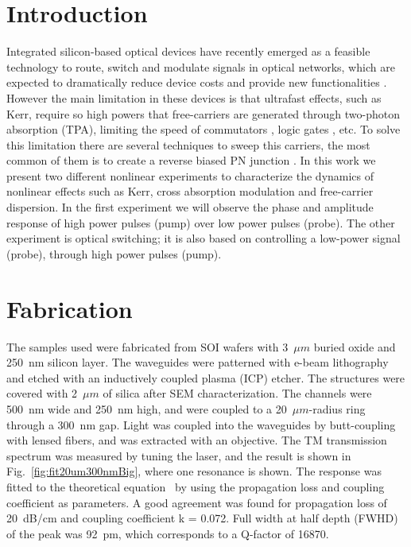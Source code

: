 \section{Introduction}
Integrated silicon-based optical devices have recently emerged as a feasible technology to route, switch and modulate signals in optical networks, which are expected to dramatically reduce device costs and provide new functionalities \cite{Soref2006}. However the main limitation in these devices is that ultrafast effects, such as Kerr, require so high powers that free-carriers are generated through two-photon absorption (TPA), limiting the speed of commutators \cite{Oton}, logic gates \cite{Oton2010}, etc.
To solve this limitation there are several techniques to sweep this carriers, the most common  of them is to create a reverse biased PN junction \cite{Turner-Foster2010}.
In this work we present two different nonlinear experiments to characterize the dynamics of nonlinear effects such as Kerr, cross absorption modulation and free-carrier dispersion. In the first experiment we will observe the phase and amplitude response of high power pulses (pump) over low power pulses (probe). The other experiment is optical switching; it is also based on controlling a low-power signal (probe), through high power pulses (pump).


 
\section{Fabrication}
The samples used were fabricated from SOI wafers with 3~$\mu m$ buried oxide and 250~nm silicon layer. The waveguides were patterned with e-beam lithography and etched with an inductively coupled plasma (ICP) etcher. The structures were covered with 2~$\mu m$ of silica after SEM characterization. The channels were 500~nm wide and 250~nm high, and were coupled to a 20~$\mu m$-radius ring through a 300~nm gap. Light was coupled into the waveguides by butt-coupling with lensed fibers, and was extracted with an objective. The TM transmission spectrum was measured by tuning the laser, and the result is shown in Fig.~\ref{fig:fit20um300nmBig}, where one resonance is shown. The response was fitted to the theoretical equation~\cite{heebner2007optical} by using the propagation loss and coupling coefficient as parameters. A good agreement was found for propagation loss of 20~dB/cm and coupling coefficient k = 0.072. Full width at half depth (FWHD) of the peak was 92~pm, which corresponds to a Q-factor of 16870. 


